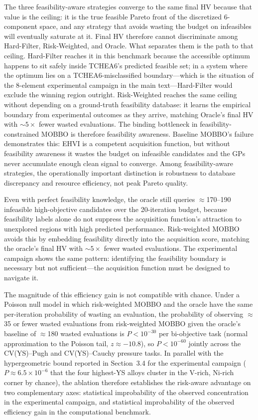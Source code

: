 \documentclass[preprint,12pt,times]{elsarticle}  %
\begin{document}
The three feasibility-aware strategies converge to the same final HV because that value is the ceiling: it is the true feasible Pareto front of the discretized 6-component space, and any strategy that avoids wasting the budget on infeasibles will eventually saturate at it. Final HV therefore cannot discriminate among Hard-Filter, Risk-Weighted, and Oracle. What separates them is the path to that ceiling. Hard-Filter reaches it in this benchmark because the accessible optimum happens to sit safely inside TCHEA6's predicted feasible set; in a system where the optimum lies on a TCHEA6-misclassified boundary---which is the situation of the 8-element experimental campaign in the main text---Hard-Filter would exclude the winning region outright. Risk-Weighted reaches the same ceiling without depending on a ground-truth feasibility database: it learns the empirical boundary from experimental outcomes as they arrive, matching Oracle's final HV with ${\sim}5\times$ fewer wasted evaluations. The binding bottleneck in feasibility-constrained MOBBO is therefore feasibility awareness. Baseline MOBBO's failure demonstrates this: EHVI is a competent acquisition function, but without feasibility awareness it wastes the budget on infeasible candidates and the GPs never accumulate enough clean signal to converge. Among feasibility-aware strategies, the operationally important distinction is robustness to database discrepancy and resource efficiency, not peak Pareto quality.

Even with perfect feasibility knowledge, the oracle still queries $\approx$170--190 infeasible high-objective candidates over the 20-iteration budget, because feasibility labels alone do not suppress the acquisition function's attraction to unexplored regions with high predicted performance. Risk-weighted MOBBO avoids this by embedding feasibility directly into the acquisition score, matching the oracle's final HV with ${\sim}5\times$ fewer wasted evaluations. The experimental campaign shows the same pattern: identifying the feasibility boundary is necessary but not sufficient---the acquisition function must be designed to navigate it.

The magnitude of this efficiency gain is not compatible with chance. Under a Poisson null model in which risk-weighted MOBBO and the oracle have the same per-iteration probability of wasting an evaluation, the probability of observing $\approx$35 or fewer wasted evaluations from risk-weighted MOBBO given the oracle's baseline of $\approx$180 wasted evaluations is $P < 10^{-30}$ per bi-objective task (normal approximation to the Poisson tail, $z \approx -10.8$), so $P < 10^{-60}$ jointly across the CV(YS)--Pugh and CV(YS)--Cauchy pressure tasks. In parallel with the hypergeometric bound reported in Section~3.4 for the experimental campaign ($P \approx 6.5 \times 10^{-6}$ that the four highest-YS alloys cluster in the V-rich, Ni-rich corner by chance), the ablation therefore establishes the risk-aware advantage on two complementary axes: statistical improbability of the observed concentration in the experimental campaign, and statistical improbability of the observed efficiency gain in the computational benchmark.
\end{document}
